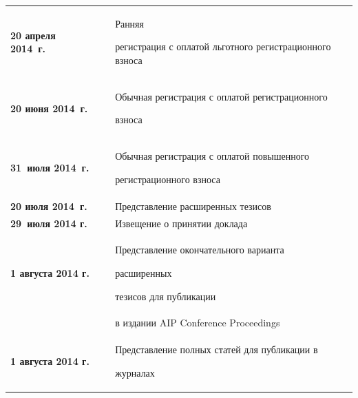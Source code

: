 \vspace*{6pt}





{\centerline{}}





\vspace*{6pt}





{\tabcolsep=0pt 


\begin{tabular}{lp{1mm}l} 





\textbf{20 апреля 2014~г.} &\ & Ранняя 


регистрация с оплатой льготного регистрационного взноса\\





\textbf{20 июня 2014~г.} &\ & Обычная регистрация с оплатой регистрационного 


взноса\\





\textbf{31~июля 2014~г.}&\ & Обычная регистрация с оплатой повышенного 


регистрационного взноса\\





\textbf{20 июля 2014~г.}&\ & Представление расширенных тезисов\\





\textbf{29~июля 2014 г.}&\ & Извещение о принятии доклада \\





\textbf{1 августа 2014 г.}&\ & Представление окончательного варианта 


расширенных 


тезисов для публикации\\


&& в издании AIP Conference Proceedings \\





\textbf{1 августа 2014 г.}&\ & Представление полных статей для публикации в 


журналах 


\end{tabular}}


   \thispagestyle{empty}


